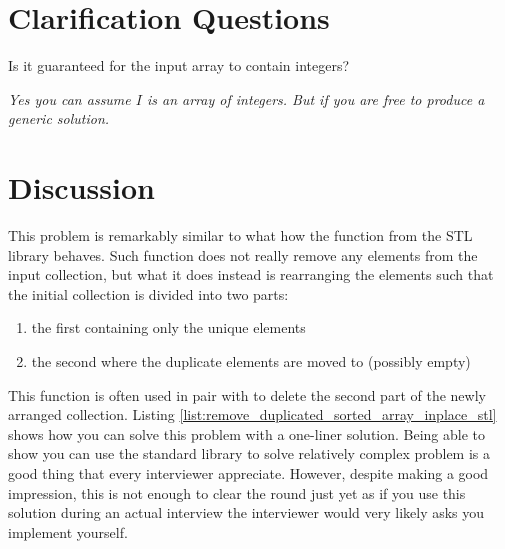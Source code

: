 \section{Clarification Questions}

\begin{QandA}
	\item Is it guaranteed for the input array to  contain integers? 
	\begin{answered}
		\textit{Yes you can assume $I$ is an array of integers. But if you are free to produce a generic solution.}
	\end{answered}	
\end{QandA}

\section{Discussion}
\label{remove_duplicated_sorted_array_inplace:sec:discussion}
This problem is remarkably similar to what how the function  from the STL
library behaves. Such function does not really remove any elements from the input collection, but
what it does instead is rearranging the elements such that the initial collection is divided into
two parts:
\begin{enumerate}
	\item the first containing only the unique elements
	\item the second where the duplicate elements are moved to (possibly empty)
\end{enumerate}
This function is often used in pair with  to delete the second part of the newly
arranged collection. Listing \ref{list:remove_duplicated_sorted_array_inplace_stl} shows how you can
solve this problem with a one-liner solution. Being able to show you can use the standard library to
solve relatively complex problem is a good thing that every interviewer appreciate. However, despite
making a good impression, this is not enough to clear the round just yet as if you use this solution
during an actual interview the interviewer would very likely asks you implement 
yourself.

\begin{minipage}{\linewidth}
	
\end{minipage}

